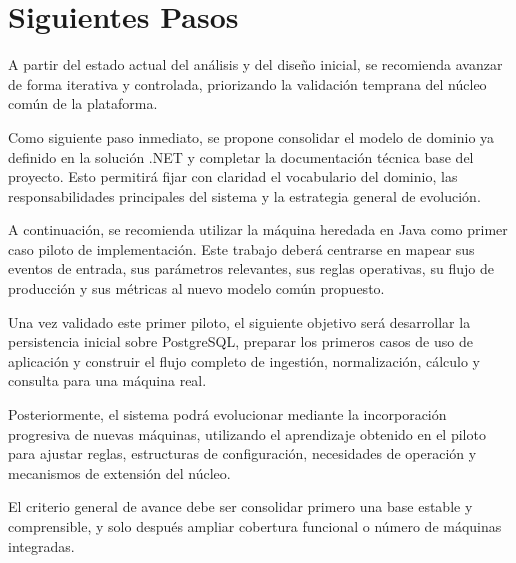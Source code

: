 \section{Siguientes Pasos}

A partir del estado actual del análisis y del diseño inicial, se recomienda avanzar de forma iterativa y controlada, priorizando la validación temprana del núcleo común de la plataforma.

Como siguiente paso inmediato, se propone consolidar el modelo de dominio ya definido en la solución .NET y completar la documentación técnica base del proyecto. Esto permitirá fijar con claridad el vocabulario del dominio, las responsabilidades principales del sistema y la estrategia general de evolución.

A continuación, se recomienda utilizar la máquina heredada en Java como primer caso piloto de implementación. Este trabajo deberá centrarse en mapear sus eventos de entrada, sus parámetros relevantes, sus reglas operativas, su flujo de producción y sus métricas al nuevo modelo común propuesto.

Una vez validado este primer piloto, el siguiente objetivo será desarrollar la persistencia inicial sobre PostgreSQL, preparar los primeros casos de uso de aplicación y construir el flujo completo de ingestión, normalización, cálculo y consulta para una máquina real.

Posteriormente, el sistema podrá evolucionar mediante la incorporación progresiva de nuevas máquinas, utilizando el aprendizaje obtenido en el piloto para ajustar reglas, estructuras de configuración, necesidades de operación y mecanismos de extensión del núcleo.

El criterio general de avance debe ser consolidar primero una base estable y comprensible, y solo después ampliar cobertura funcional o número de máquinas integradas.